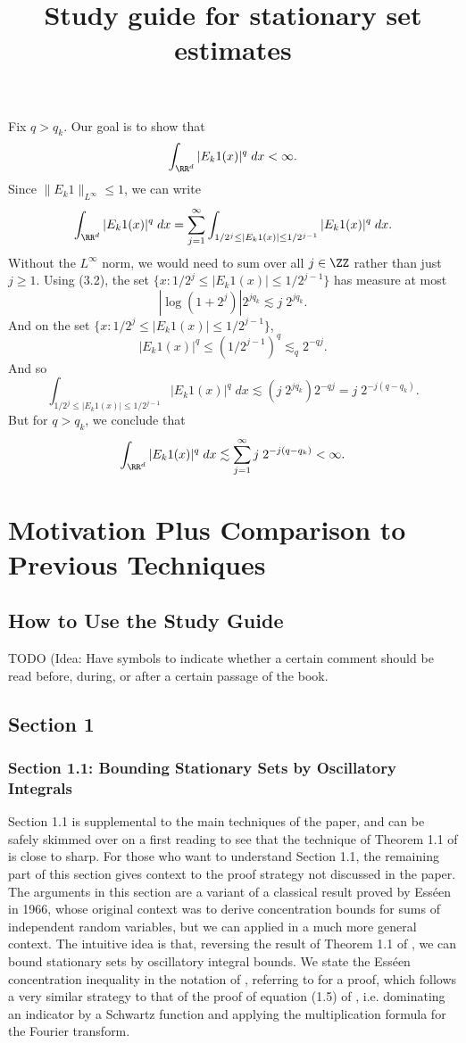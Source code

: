 \documentclass[12pt]{article}
\title{Study guide for stationary set estimates}
\theoremstyle{definition}
\theoremstyle{remark}
\numberwithin{equation}{section}
\begin{document}
Fix $q > q_k$. Our goal is to show that
%
\[ \int_{\RR^d} |E_k 1(x)|^q\; dx < \infty. \]
%
Since $\| E_k 1 \|_{L^\infty} \leq 1$, we can write
%
\[ \int_{\RR^d} |E_k 1(x)|^q\; dx = \sum_{j = 1}^\infty \int_{1/2^j \leq |E_k 1(x)| \leq 1/2^{j-1}} |E_k 1(x)|^q\; dx. \]
%
Without the $L^\infty$ norm, we would need to sum over all $j \in \ZZ$ rather than just $j \geq 1$. Using (3.2), the set $\{ x : 1/2^j \leq |E_k 1(x)| \leq 1/2^{j-1} \}$ has measure at most
%
\[ |\log(1 + 2^j)| 2^{jq_k} \lesssim j\; 2^{jq_k}. \]
%
And on the set $\{ x : 1/2^j \leq |E_k 1(x)| \leq 1/2^{j-1} \}$,
%
\[ |E_k 1(x)|^q \leq (1/2^{j-1})^q \lesssim_q 2^{-qj}. \]
%
And so
%
\[ \int_{1/2^j \leq |E_k 1(x)| \leq 1/2^{j-1}} |E_k 1(x)|^q\; dx \lesssim (j\; 2^{jq_k}) 2^{-qj} = j\; 2^{-j(q - q_k)}. \]
%
But for $q > q_k$, we conclude that
%
\[ \int_{\RR^d} |E_k 1(x)|^q\; dx \lesssim \sum_{j = 1}^\infty j\; 2^{-j(q - q_k)} < \infty. \]

\chapter*{Motivation Plus Comparison to Previous Techniques}

\section{How to Use the Study Guide}

TODO (Idea: Have symbols to indicate whether a certain comment should be read before, during, or after a certain passage of the book.

\section{Section 1}

\subsection*{Section 1.1: Bounding Stationary Sets by Oscillatory Integrals}

Section 1.1 is supplemental to the main techniques of the paper, and can be safely skimmed over on a first reading to see that the technique of Theorem 1.1 of \cite{BGZZ} is close to sharp. For those who want to understand Section 1.1, the remaining part of this section gives  context to the proof strategy not discussed in the paper. The arguments in this section are a variant of a classical result \cite{Esseen} proved by Ess\'{e}en in 1966, whose original context was to derive concentration bounds for sums of independent random variables, but we can applied in a much more general context. The intuitive idea is that, reversing the result of Theorem 1.1 of \cite{BGZZ}, we can bound stationary sets by oscillatory integral bounds. We state the Ess\'{e}en concentration inequality in the notation of \cite{BGZZ}, referring to \cite{TaoVu} for a proof, which follows a very similar strategy to that of the proof of equation (1.5) of \cite{BGZZ}, i.e. dominating an indicator by a Schwartz function and applying the multiplication formula for the Fourier transform.
\end{document}
